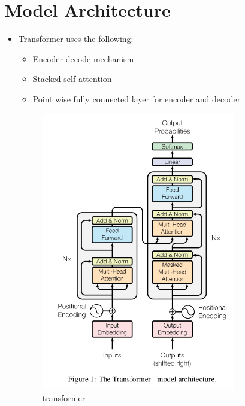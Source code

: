 \documentclass[a4paper]{article}
\begin{document}
\section{Model Architecture}
\begin{itemize}
    \item Transformer uses the following:
    \begin{itemize}
        \item Encoder decode mechanism
        \item Stacked self attention
        \item Point wise fully connected layer for encoder and decoder
    \end{itemize}
    \begin{figure}[H]
        \centering
        \includegraphics[width=0.8\textwidth]{transformer}
        \caption{transformer}
        \label{fig:transformer}
    \end{figure}
\end{itemize}
\end{document}
